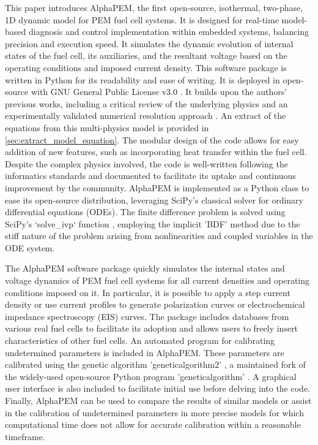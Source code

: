 \documentclass[postprint,3p,times]{elsarticle}
\begin{document}
This paper introduces AlphaPEM, the first open-source, isothermal, two-phase, 1D dynamic model for PEM fuel cell systems. It is designed for real-time model-based diagnosis and control implementation within embedded systems, balancing precision and execution speed. It simulates the dynamic evolution of internal states of the fuel cell, its auxiliaries, and the resultant voltage based on the operating conditions and imposed current density. This software package is written in Python for its readability and ease of writing. It is deployed in open-source with GNU General Public License v3.0 \cite{gnuGNUGeneralPublic2007}. It builds upon the authors' previous works, including a critical review of the underlying physics \cite{gassCriticalReviewProton2024} and an experimentally validated numerical resolution approach \cite{gassAdvanced1DPhysicsbased2025}. An extract of the equations from this multi-physics model is provided in \ref{sec:extract_model_equation}. The modular design of the code allows for easy addition of new features, such as incorporating heat transfer within the fuel cell. Despite the complex physics involved, the code is well-written following the informatics standards \cite{numpyStyleGuide2024} and documented to facilitate its uptake and continuous improvement by the community. AlphaPEM is implemented as a Python class to ease its open-source distribution, leveraging SciPy's classical solver for ordinary differential equations (ODEs). The finite difference problem is solved using SciPy's `solve\_ivp` function \cite{scipyScipyIntegrateSolve_ivp}, employing the implicit 'BDF' method due to the stiff nature of the problem arising from nonlinearities and coupled variables in the ODE system.

The AlphaPEM software package quickly simulates the internal states and voltage dynamics of PEM fuel cell systems for all current densities and operating conditions imposed on it. In particular, it is possible to apply a step current density or use current profiles to generate polarization curves or electrochemical impedance spectroscopy (EIS) curves. The package includes databases from various real fuel cells \cite{fanCharacteristicsPEMFCOperating2017, xieValidationMethodologyPEM2022, EHGroupClean, BalticFuelCells} to facilitate its adoption and allows users to freely insert characteristics of other fuel cells. An automated program for calibrating undetermined parameters is included in AlphaPEM. These parameters are calibrated using the genetic algorithm 'geneticalgorithm2' \cite{pascalGeneticalgorithm22024}, a maintained fork of the widely-used open-source Python program 'geneticalgorithm' \cite{solgiGeneticalgorithm2020}. A graphical user interface is also included to facilitate initial use before delving into the code. Finally, AlphaPEM can be used to compare the results of similar models or assist in the calibration of undetermined parameters in more precise models for which computational time does not allow for accurate calibration within a reasonable timeframe.
\end{document}
